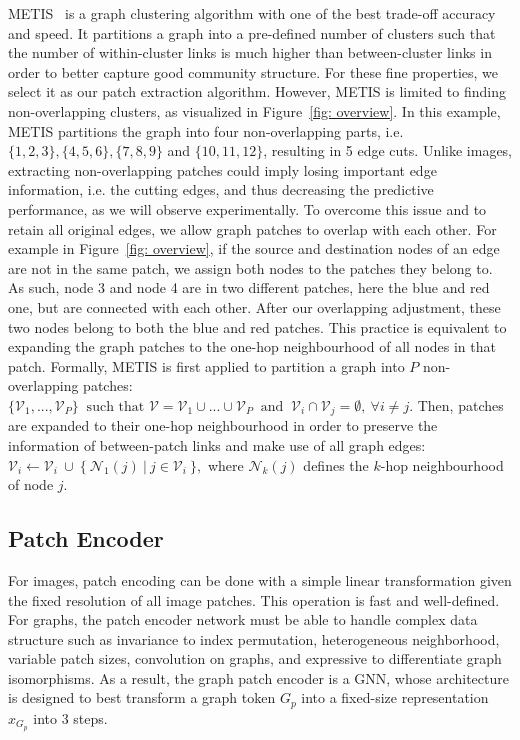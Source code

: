 \documentclass{article}
\begin{document}
METIS~\citep{karypis1998metis} is a graph clustering algorithm with one of the best trade-off accuracy and speed. It partitions a graph into a pre-defined number of clusters such that the number of within-cluster links is much higher than between-cluster links in order to better capture good community structure. For these fine properties, we select it as our patch extraction algorithm. 
However, METIS is limited to finding non-overlapping clusters, as visualized in Figure~\ref{fig: overview}. In this example, METIS partitions the graph into four non-overlapping parts, i.e. $\{1,2,3\}, \{4,5,6\}, \{7,8,9\}$ and $\{10,11,12\}$, resulting in 5 edge cuts. Unlike images, extracting non-overlapping patches could imply losing important edge information, i.e. the cutting edges, and thus decreasing the predictive performance, as we will observe experimentally. To overcome this issue and to retain all original edges, we allow graph patches to overlap with each other. For example in Figure~\ref{fig: overview}, if the source and destination nodes of an edge are not in the same patch, we assign both nodes to the patches they belong to. As such, node 3 and node 4 are in two different patches, here the blue and red one, but are connected with each other. After our overlapping adjustment, these two nodes belong to both the blue and red patches. This practice is equivalent to expanding the graph patches to the one-hop neighbourhood of all nodes in that patch. Formally, METIS is first applied to partition a graph into $P$ non-overlapping patches: $\{\mathcal{V}_1, ..., \mathcal{V}_P\} \ \textrm{ such that } \mathcal{V} = \mathcal{V}_1 \cup ... \cup \mathcal{V}_P \  \textrm{ and } \  \mathcal{V}_i \cap \mathcal{V}_j = \emptyset, \  \forall i\ne j.$
Then, patches are expanded to their one-hop neighbourhood in order to preserve the information of between-patch links and make use of all graph edges: $\mathcal{V}_{i} \leftarrow  \mathcal{V}_{i} \ \cup \ \{ \ \mathcal{N}_1(j) \ | \ {j\in \mathcal{V}_i} \ \},$ where $\mathcal{N}_k(j)$ defines the $k$-hop neighbourhood of node $j$.


\subsection{Patch Encoder}

For images, patch encoding can be done with a simple linear transformation given the fixed resolution of all image patches. This operation is fast and well-defined. For graphs, the patch encoder network must be able to handle complex data structure such as invariance to index permutation, heterogeneous neighborhood, variable patch sizes, convolution on graphs, and expressive to differentiate graph isomorphisms. As a result, the graph patch encoder is a GNN, whose architecture is designed to best transform a graph token $G_p$ into a fixed-size representation $x_{G_p}$ into 3 steps.
\end{document}
